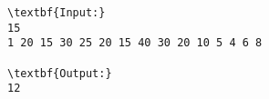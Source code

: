 \begin{verbatim}
\textbf{Input:}
15
1 20 15 30 25 20 15 40 30 20 10 5 4 6 8

\textbf{Output:}
12
\end{verbatim}